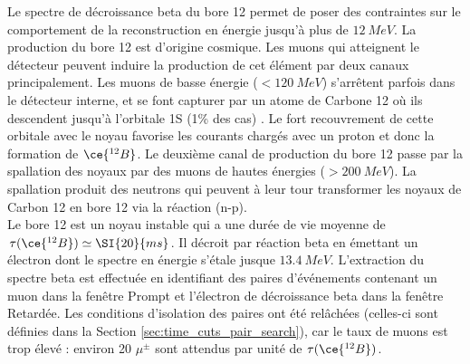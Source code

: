 Le spectre de décroissance beta du bore 12 permet de poser des contraintes sur le comportement de la reconstruction en énergie jusqu'à plus de $\SI{12}{MeV}$. La production du bore 12 est d'origine cosmique. Les muons qui atteignent le détecteur peuvent induire la production de cet élément par deux canaux principalement. Les muons de basse énergie ($< \SI{120}{MeV}$) s'arrêtent parfois dans le détecteur interne, et se font capturer par un atome de Carbone 12 où ils descendent jusqu'à l'orbitale 1S (1\% des cas) \cite{Reynolds:1963zz}. Le fort recouvrement de cette orbitale avec le noyau favorise les courants chargés avec un proton et donc la formation de $\ce{^{12}B}$. Le deuxième canal de production du bore 12 passe par la spallation des noyaux par des muons de hautes énergies ($> \SI{200}{MeV}$). La spallation produit des neutrons qui peuvent à leur tour transformer les noyaux de Carbon 12 en bore 12 via la réaction (n-p).\\

Le bore 12 est un noyau instable qui a une durée de vie moyenne de $\tau (\ce{^{12}B}) \simeq \SI{20}{ms}$. Il décroit par réaction beta en émettant un électron dont le spectre en énergie s'étale jusque $\SI{13.4}{MeV}$. L'extraction du spectre beta est effectuée en identifiant des paires d'événements contenant un muon dans la fenêtre Prompt et l'électron de décroissance beta dans la fenêtre Retardée. Les conditions d'isolation des paires ont été relâchées (celles-ci sont définies dans la Section \ref{sec:time_cuts_pair_search}), car le taux de muons est trop élevé : environ 20 $\mu^{\pm}$ sont attendus par unité de $\tau (\ce{^{12}B})$.\\


